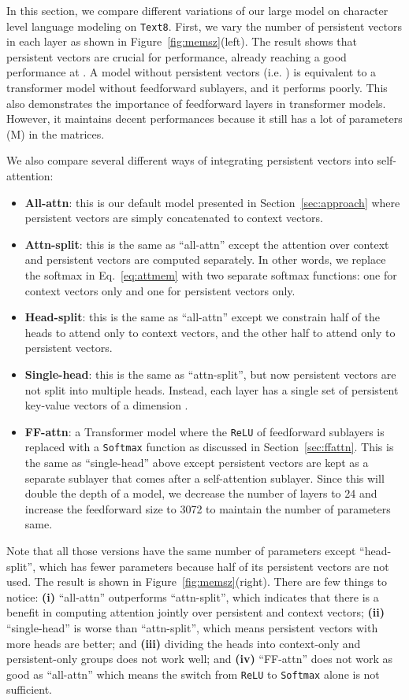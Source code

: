\documentclass{article}
\newcommand{\secc}[1]{Section~\ref{sec:#1}}
\newcommand{\fig}[1]{Figure~\ref{fig:#1}}
\newcommand{\eq}[1]{Eq.~\ref{eq:#1}}
\begin{document}
In this section, we compare different variations of our large model on character level language modeling on \texttt{Text8}.
First, we vary the number of persistent vectors  in each layer as shown in \fig{memsz}(left).
The result shows that persistent vectors are crucial for performance, already reaching a good performance at .
A model without persistent vectors (i.e. ) is equivalent to a transformer model without feedforward sublayers, and it performs poorly.
This also demonstrates the importance of feedforward layers in transformer models.
However, it maintains decent performances because it still has a lot of parameters (M) in the  matrices.

We also compare several different ways of integrating persistent vectors into self-attention:
\begin{itemize}
  \item {\bf All-attn}: this is our default model presented in \secc{approach} where persistent vectors are simply concatenated to context vectors.
  \item {\bf Attn-split}: this is the same as ``all-attn'' except the attention over context and persistent vectors are computed separately. In other words, we replace the softmax in \eq{attmem} with two separate softmax functions: one for context vectors only and one for persistent vectors only.
  \item {\bf Head-split}: this is the same as ``all-attn'' except we constrain half of the heads to attend only to context vectors, and the other half to attend only to persistent vectors.
  \item {\bf Single-head}: this is the same as ``attn-split'', but now persistent vectors are not split into multiple heads. Instead, each layer has a single set of persistent key-value vectors of a dimension .
  \item {\bf FF-attn}: a Transformer model where the \texttt{ReLU} of feedforward sublayers is replaced with a \texttt{Softmax} function as discussed in \secc{ffattn}. This is the same as ``single-head'' above except persistent vectors are kept as a separate sublayer that comes after a self-attention sublayer. Since this will double the depth of a model, we decrease the number of layers to 24 and increase the feedforward size to 3072 to maintain the number of parameters same.
\end{itemize}
Note that all those versions have the same number of parameters except ``head-split'', which has fewer parameters because half of its persistent vectors are not used.
The result is shown in \fig{memsz}(right).
There are few things to notice: {\bf (i)} ``all-attn'' outperforms ``attn-split'', which indicates that there is a benefit in computing attention jointly over persistent and context vectors; {\bf (ii)} ``single-head'' is worse than ``attn-split'', which means persistent vectors with more heads are better; and {\bf (iii)} dividing the heads into context-only and persistent-only groups does not work well; and {\bf (iv)} ``FF-attn'' does not work as good as ``all-attn'' which means the switch from \texttt{ReLU} to \texttt{Softmax} alone is not sufficient.
 
\end{document}

